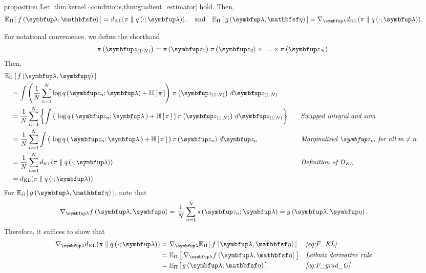 
\begin{theoremEnd}{proposition}\label{thm:product_kernel}
  Let \cref{thm:kernel_conditions,thm:gradient_estimator} hold.
  Then,
  \begin{align*}
    \Esub{\Pi}{ f\left(\vlambda, \rvveta\right) } = \DKL{\pi}{q\left(\cdot; \vlambda\right)},
    \quad\text{and}\quad
    \Esub{\Pi}{ g\left(\vlambda, \rvveta\right) } = \nabla_{\vlambda} \DKL{\pi}{q\left(\cdot; \vlambda\right)}.
  \end{align*}
\end{theoremEnd}
\begin{proofEnd}
  For notational convenience, we define the shorthand
  \begin{align*}
    \pi\left(\vz_{(1:N)}\right) = \pi\left(\vz_1\right) \, \pi\left(\vz_2\right) \times \ldots \times \pi\left(\vz_N\right).
  \end{align*}
  Then,
  \begin{alignat}{2}
    &\Esub{\Pi}{ f\left(\vlambda, \veta\right) }
    \nonumber
    \\
    &\quad=
    \int \left( \frac{1}{N} \sum^{N}_{n=1} \log q\left(\vz_n; \vlambda\right) + \mathbb{H}\left[\,\pi\,\right]\right) \, \pi\left(\vz_{(1:N)}\right) \, d\vz_{(1:N)}
    \nonumber
    \\
    &\quad=
     \frac{1}{N} \sum^{N}_{n=1} \left\{ \int \big(\, \log q\,(\,\vz_n; \vlambda\,) + \mathbb{H}\,[\,\pi\,] \,\big) \, \pi\left(\vz_{(1:N)}\right) \, d\vz_{(1:N)} \right\}
     &&\quad{\text{\textit{Swapped integral and sum}}}
    \nonumber
    \\
    &\quad=
    \frac{1}{N} \sum^{N}_{n=1} \int \big(\, \log q\,(\,\vz_n; \vlambda\,) + \mathbb{H}\,[\,\pi\,] \,\big) \, \pi\left(\vz_n\right) \, d\vz_{n}
    &&\quad{\text{\textit{Marginalized \(\vz_m\) for all \(m \neq n\)}}}
    \nonumber
    \\
    &\quad=
    \frac{1}{N} \sum^{N}_{n=1} \DKL{\pi}{q\left(\cdot; \vlambda\right)}
    \nonumber
    &&\quad{\text{\textit{Definition of \(D_{\text{KL}}\)}}}
    \\
    &\quad=
    \DKL{\pi}{q\left(\cdot; \vlambda\right)}\label{eq:F_KL}
  \end{alignat}
  For \(\Esub{\Pi}{ g\left(\vlambda, \rvveta\right) }\), note that 
  \begin{align}
    \nabla_{\vlambda} f\left(\vlambda, \veta\right) = \frac{1}{N} \sum^{N}_{n=1} s\left(\vz_n; \vlambda\right) = g\left(\vlambda, \veta\right).\label{eq:F_grad_G}
  \end{align}
  Therefore, it suffices to show that
  \begin{align*}
    \nabla_{\vlambda} \DKL{\pi}{q\left(\cdot; \vlambda\right)}
    &=
    \nabla_{\vlambda} \Esub{\Pi}{ f\left(\vlambda, \rvveta\right) }
    &&\text{\textit{\cref{eq:F_KL}}}
    \\
    &=
    \Esub{\Pi}{ \nabla_{\vlambda}  f\left(\vlambda, \rvveta\right) }
    &&\text{\textit{{Leibniz derivative rule}}}
    \\
    &=
    \Esub{\Pi}{ g\left(\vlambda, \rvveta\right) }.
    &&\text{\textit{\cref{eq:F_grad_G}}}
  \end{align*}
\end{proofEnd}

